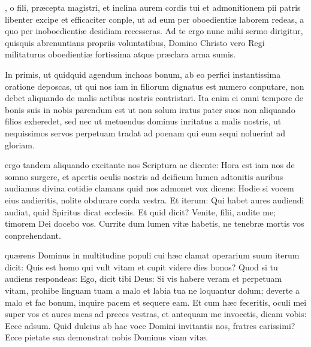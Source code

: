 \documentclass[fontsize=9pt,paper=A6,twoside,BCOR=1mm,DIV=22,headinclude]{scrarticle}
\begin{document}
\begin{multicols}{2}


, o fili, præcepta magistri, et inclina aurem cordis tui et admonitionem pii patris libenter excipe et efficaciter conple, ut ad eum per oboedientiæ laborem redeas, a quo per inoboedientiæ desidiam recesseras. Ad te ergo nunc mihi sermo dirigitur, quisquis abrenuntians propriis voluntatibus, Domino Christo vero Regi militaturus oboedientiæ fortissima atque præclara arma sumis.

In primis, ut quidquid agendum inchoas bonum, ab eo perfici instantissima oratione deposcas, ut qui nos iam in filiorum dignatus est numero conputare, non debet aliquando de malis actibus nostris contristari. Ita enim ei omni tempore de bonis suis in nobis parendum est ut non solum iratus pater suos non aliquando filios exheredet, sed nec ut metuendus dominus inritatus a malis nostris, ut nequissimos servos perpetuam tradat ad poenam qui eum sequi noluerint ad gloriam.


 ergo tandem aliquando excitante nos Scriptura ac dicente: Hora est iam nos de somno surgere, et apertis oculis nostris ad deificum lumen adtonitis auribus audiamus divina cotidie clamans quid nos admonet vox dicens: Hodie si vocem eius audieritis, nolite obdurare corda vestra. Et iterum: Qui habet aures audiendi audiat, quid Spiritus dicat ecclesiis. Et quid dicit? Venite, filii, audite me; timorem Dei docebo vos. Currite dum lumen vitæ habetis, ne tenebræ mortis vos conprehendant.


 quærens Dominus in multitudine populi cui hæc clamat operarium suum iterum dicit: Quis est homo qui vult vitam et cupit videre dies bonos? Quod si tu audiens respondeas: Ego, dicit tibi Deus: Si vis habere veram et perpetuam vitam, prohibe linguam tuam a malo et labia tua ne loquantur dolum; deverte a malo et fac bonum, inquire pacem et sequere eam. Et cum hæc feceritis, oculi mei super vos et aures meas ad preces vestras, et antequam me invocetis, dicam vobis: Ecce adsum. Quid dulcius ab hac voce Domini invitantis nos, fratres carissimi? Ecce pietate sua demonstrat nobis Dominus viam vitæ.


\end{multicols}
\end{document}
